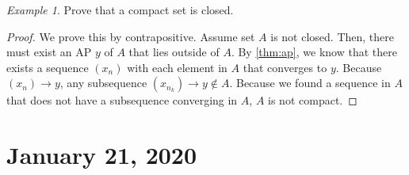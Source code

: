 \documentclass[11pt]{article}
\theoremstyle{plain}
\theoremstyle{definition}
\theoremstyle{remark}
\newtheorem{exm}{Example}[section]
\begin{document}
\begin{exm}
    Prove that a compact set is closed.
\end{exm}
\begin{proof}
    We prove this by contrapositive. Assume set $A$ is not closed. Then, there must exist an AP $y$ of $A$ that lies outside of $A$. By \ref{thm:ap}, we know that there exists a sequence $(x_n)$ with each element in $A$ that converges to $y$. Because $(x_n) \rightarrow y$, any subsequence $(x_{n_k}) \rightarrow y \notin A$. Because we found a sequence in $A$ that does not have a subsequence converging in $A$, $A$ is not compact.
\end{proof}

\section{January 21, 2020}
\end{document}
